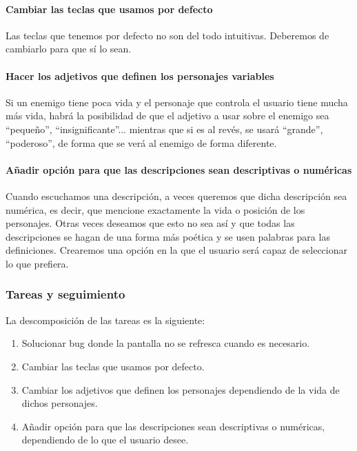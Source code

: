 \paragraph{Cambiar las teclas que usamos por defecto} Las teclas que tenemos por defecto no son del todo intuitivas. Deberemos de cambiarlo para que sí lo sean.

\paragraph{Hacer los adjetivos que definen los personajes variables} Si un enemigo tiene poca vida y el personaje que controla el usuario tiene mucha más vida, habrá la posibilidad de que el adjetivo a usar sobre el enemigo sea ``pequeño'', ``insignificante''... mientras que si es al revés, se usará ``grande'', ``poderoso'', de forma que se verá al enemigo de forma diferente.

\paragraph{Añadir opción para que las descripciones sean descriptivas o numéricas} Cuando escuchamos una descripción, a veces queremos que dicha descripción sea numérica, es decir, que mencione exactamente la vida o posición de los personajes. Otras veces deseamos que esto no sea así y que todas las descripciones se hagan de una forma más poética y se usen palabras para las definiciones. Crearemos una opción en la que el usuario será capaz de seleccionar lo que prefiera.

\subsubsection{Tareas y seguimiento}

La descomposición de las tareas es la siguiente:

\begin{enumerate}[label=\bfseries WBS 7.\arabic*]
  \item Solucionar bug donde la pantalla no se refresca cuando es necesario.
  \item Cambiar las teclas que usamos por defecto.
  \item Cambiar los adjetivos que definen los personajes dependiendo de la vida de dichos personajes.
  \item Añadir opción para que las descripciones sean descriptivas o numéricas, dependiendo de lo que el usuario desee.
\end{enumerate}


